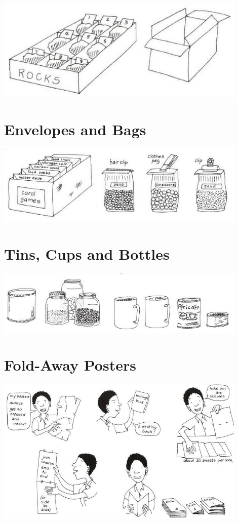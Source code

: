 \begin{center}
\includegraphics[width=12cm]{./img/vso/dividing-boxes.jpg}
\end{center}


\section{Envelopes and Bags}

\begin{center}
\includegraphics[width=12cm]{./img/vso/envelopes-bags.jpg}
\end{center}


\section{Tins, Cups and Bottles}

\begin{center}
\includegraphics[width=12cm]{./img/vso/tins-cups.jpg}
\end{center}


\section{Fold-Away Posters}

\begin{center}
\includegraphics[width=12cm]{./img/vso/folding-posters.jpg}
\end{center}
